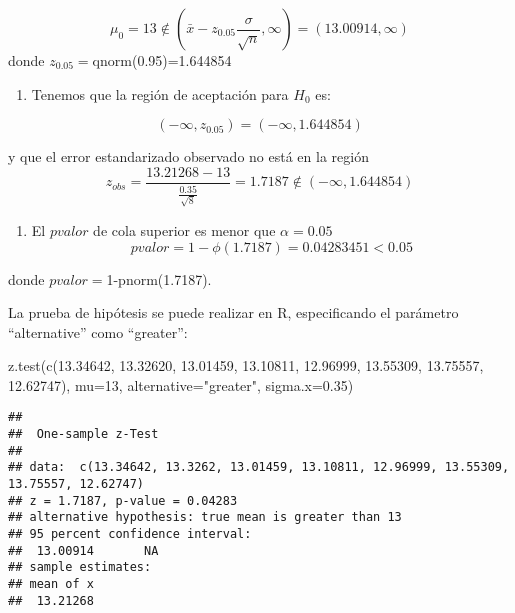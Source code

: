 \documentclass[
]{book}
\newenvironment{Shaded}{\begin{snugshade}}{\end{snugshade}}
\newcommand{\AttributeTok}[1]{\textcolor[rgb]{0.77,0.63,0.00}{#1}}
\newcommand{\DecValTok}[1]{\textcolor[rgb]{0.00,0.00,0.81}{#1}}
\newcommand{\FloatTok}[1]{\textcolor[rgb]{0.00,0.00,0.81}{#1}}
\newcommand{\FunctionTok}[1]{\textcolor[rgb]{0.00,0.00,0.00}{#1}}
\newcommand{\NormalTok}[1]{#1}
\newcommand{\StringTok}[1]{\textcolor[rgb]{0.31,0.60,0.02}{#1}}
\providecommand{\tightlist}{%
  \setlength{\itemsep}{0pt}\setlength{\parskip}{0pt}}
\begin{document}
\[\mu_0=13 \notin (\bar{x}-z_{0.05} \frac{\sigma}{\sqrt{n}}, \infty)=(13.00914, \infty)\]
donde \(z_{0.05}=\)qnorm(0.95)=1.644854

\begin{enumerate}
\def\labelenumi{\arabic{enumi}.}
\setcounter{enumi}{1}
\tightlist
\item
  Tenemos que la región de aceptación para \(H_0\) es:
\end{enumerate}

\[(-\infty, z_{0.05})=( -\infty, 1.644854)\]

y que el error estandarizado observado no está en la región
\[z_{obs} = \frac{13.21268-13}{\frac{0.35}{\sqrt{8}}}=1.7187 \notin ( -\infty, 1.644854)\]

\begin{enumerate}
\def\labelenumi{\arabic{enumi}.}
\setcounter{enumi}{2}
\tightlist
\item
  El \(pvalor\) de cola superior es menor que \(\alpha=0.05\)
  \[pvalor=1-\phi(1.7187)=0.04283451 <0.05\]
\end{enumerate}

donde \(pvalor=\)1-pnorm(1.7187).

La prueba de hipótesis se puede realizar en R, especificando el parámetro ``alternative'' como ``greater'':

\begin{Shaded}
\begin{Highlighting}[]
\FunctionTok{z.test}\NormalTok{(}\FunctionTok{c}\NormalTok{(}\FloatTok{13.34642}\NormalTok{, }\FloatTok{13.32620}\NormalTok{, }\FloatTok{13.01459}\NormalTok{, }\FloatTok{13.10811}\NormalTok{,}
         \FloatTok{12.96999}\NormalTok{, }\FloatTok{13.55309}\NormalTok{, }\FloatTok{13.75557}\NormalTok{, }\FloatTok{12.62747}\NormalTok{), }
       \AttributeTok{mu=}\DecValTok{13}\NormalTok{, }\AttributeTok{alternative=}\StringTok{"greater"}\NormalTok{, }\AttributeTok{sigma.x=}\FloatTok{0.35}\NormalTok{)}
\end{Highlighting}
\end{Shaded}

\begin{verbatim}
## 
##  One-sample z-Test
## 
## data:  c(13.34642, 13.3262, 13.01459, 13.10811, 12.96999, 13.55309,     13.75557, 12.62747)
## z = 1.7187, p-value = 0.04283
## alternative hypothesis: true mean is greater than 13
## 95 percent confidence interval:
##  13.00914       NA
## sample estimates:
## mean of x 
##  13.21268
\end{verbatim}
\end{document}
